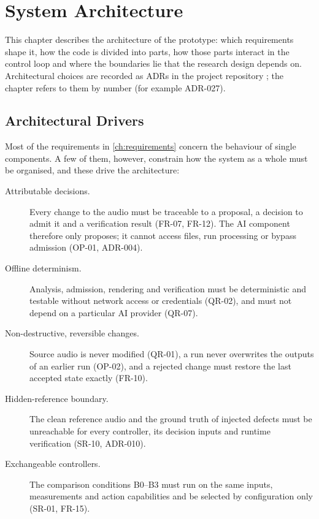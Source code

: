\chapter{System Architecture}
\label{ch:architecture}

This chapter describes the architecture of the prototype: which requirements shape it, how the code is divided into parts, how those parts interact in the control loop and where the boundaries lie that the research design depends on. Architectural choices are recorded as \acp{ADR} in the project repository \cite{AutonomousMixingSystem}; the chapter refers to them by number (for example ADR-027).

\section{Architectural Drivers}
\label{sec:arch-drivers}

Most of the requirements in \autoref{ch:requirements} concern the behaviour of single components. A few of them, however, constrain how the system as a whole must be organised, and these drive the architecture:

\begin{description}
	\item[Attributable decisions.] Every change to the audio must be traceable to a proposal, a decision to admit it and a verification result (FR-07, FR-12). The \ac{AI} component therefore only proposes; it cannot access files, run processing or bypass admission (OP-01, ADR-004).
	\item[Offline determinism.] Analysis, admission, rendering and verification must be deterministic and testable without network access or credentials (QR-02), and must not depend on a particular \ac{AI} provider (QR-07).
	\item[Non-destructive, reversible changes.] Source audio is never modified (QR-01), a run never overwrites the outputs of an earlier run (OP-02), and a rejected change must restore the last accepted state exactly (FR-10).
	\item[Hidden-reference boundary.] The clean reference audio and the ground truth of injected defects must be unreachable for every controller, its decision inputs and runtime verification (SR-10, ADR-010).
	\item[Exchangeable controllers.] The comparison conditions B0--B3 must run on the same inputs, measurements and action capabilities and be selected by configuration only (SR-01, FR-15).
\end{description}

